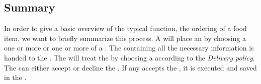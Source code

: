 \subsection{Summary}

In order to give a basic overview of the typical function, the ordering of a food item, we want to briefly summarize this process.
A \Client will place an \Order by choosing a one or more \Meal or one or more \Dish of a \Restaurant. The \Order containing all the 
necessary information is handed to the \Core. The \Core will treat the \Order by choosing a \Courier according to the \emph{Delivery policy}. 
The \Courier can either accept or decline the \Order. If any \Courier accepts the \Order, it is executed and saved in the \Core.



